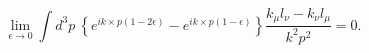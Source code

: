 \begin{equation}
  \lim_{\epsilon \to 0}
  \int d^3 p~
  \left\{ e^{i k \times p (1 - 2 \epsilon)}
          - e^{i k \times p (1 - \epsilon)} \right\}
  \frac{k_\mu l_\nu - k_\nu l_\mu}{k^2 p^2} = 0.
\end{equation}

